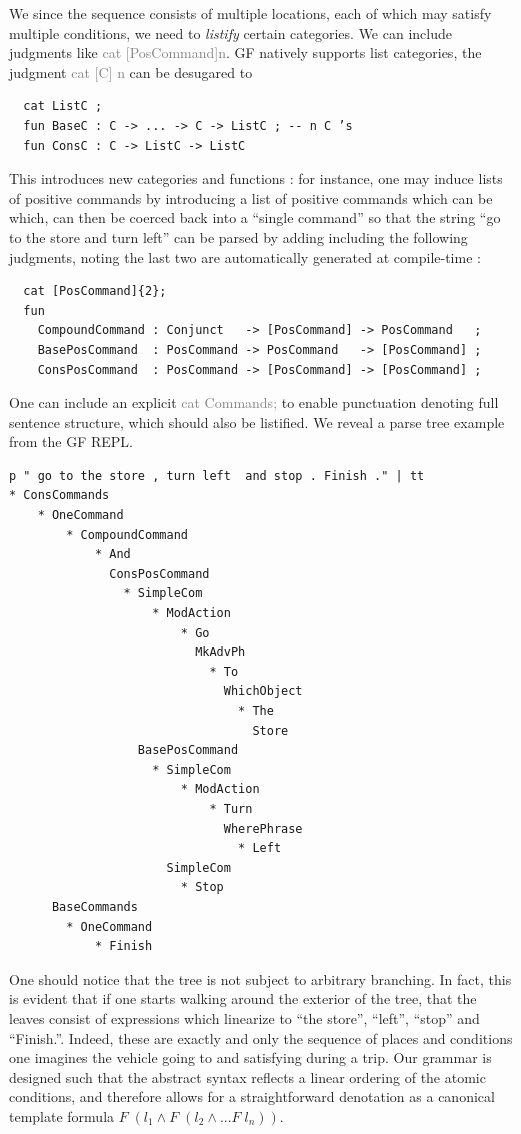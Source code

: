 \documentclass[a4paper, 11pt]{article}
\newcommand{\gray}[1]{\textcolor{gray}{#1}}
\begin{document}
We since the sequence consists of multiple locations, each of which may satisfy multiple
conditions, we need to \emph{listify} certain categories. We can include 
judgments like \gray{cat [PosCommand]{n}}.
GF natively supports list categories, the judgment \gray{cat [C] {n}} can be
desugared to

\begin{verbatim}
  cat ListC ;
  fun BaseC : C -> ... -> C -> ListC ; -- n C ’s
  fun ConsC : C -> ListC -> ListC
\end{verbatim}

This introduces new categories and functions : for instance, one may induce
lists of positive commands by introducing a list of positive commands which can
be which, can then be coerced back into a ``single command'' so that the string
``go to the store and turn left'' can be parsed by adding including the
following judgments, noting the last two are automatically generated at compile-time :

\begin{verbatim}
  cat [PosCommand]{2}; 
  fun 
    CompoundCommand : Conjunct   -> [PosCommand] -> PosCommand   ;
    BasePosCommand  : PosCommand -> PosCommand   -> [PosCommand] ;
    ConsPosCommand  : PosCommand -> [PosCommand] -> [PosCommand] ;
\end{verbatim}
 
One can include an explicit \gray{cat Commands;} to enable punctuation denoting
full sentence structure, which should also be listified. We reveal a parse tree
example from the GF REPL.

\begin{verbatim}
p " go to the store , turn left  and stop . Finish ." | tt
* ConsCommands
    * OneCommand
        * CompoundCommand
            * And
              ConsPosCommand
                * SimpleCom
                    * ModAction
                        * Go
                          MkAdvPh
                            * To
                              WhichObject
                                * The
                                  Store
                  BasePosCommand
                    * SimpleCom
                        * ModAction
                            * Turn
                              WherePhrase
                                * Left
                      SimpleCom
                        * Stop
      BaseCommands
        * OneCommand
            * Finish
\end{verbatim}

One should notice that the tree is not subject to arbitrary branching. In fact,
this is evident that if one starts walking around the exterior of the tree, that
the leaves consist of expressions which linearize to ``the store'', ``left'',
``stop'' and ``Finish.''. Indeed, these are exactly and only the sequence of
places and conditions one imagines the vehicle going to and satisfying during 
a trip. Our grammar is designed such that the abstract syntax reflects a linear
ordering of the atomic conditions, and therefore allows for a straightforward
denotation as a canonical template formula $F\; (l_1 \wedge F\; (l_{2} \wedge ... F\; l_{n}))$.
\end{document}
